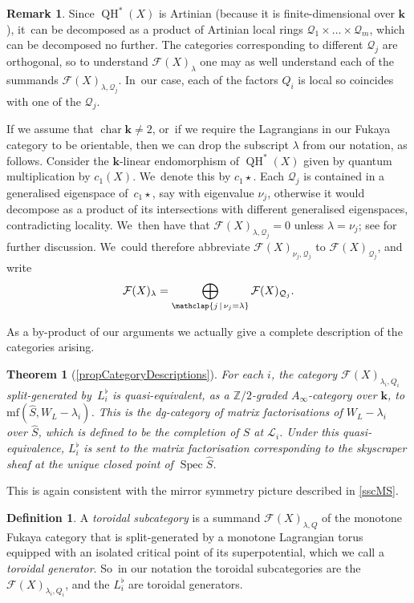 \documentclass[JEP,XML,SOM,Unicode,NoEqCountersInSection,NoFloatCountersInSection,published]{cedram}
\newtheorem{mainthm}{Theorem}
\theoremstyle{definition}
\newtheorem{definition}[theorem]{Definition}
\newtheorem{remark}[theorem]{Remark}
\newcommand{\ZZ}{\mathbb{Z}}
\newcommand{\LL}{L^\flat}
\newcommand{\hatS}{\widehat{S}}
\newcommand{\calL}{\mathcal{L}}
\newcommand{\calQ}{\mathcal{Q}}
\newcommand{\Fuk}{\mathcal{F}}
\newcommand{\kk}{{\boldsymbol{k}}}
\newcommand{\mf}{\mathrm{mf}}
\newcommand{\Char}{\operatorname{char}}
\newcommand{\Spec}{\operatorname{Spec}}
\newcommand{\QH}{\operatorname{QH}}
\newcommand{\qprod}{\mathbin{\star}}
\begin{document}
\begin{remark}
\label{rmkArtinian}
Since $\QH^*(X)$ is Artinian (because it is finite-dimensional over $\kk$), it~can be decomposed as a product of Artinian local rings $\calQ_1 \times \dots \times \calQ_m$, which can be decomposed no further. The categories corresponding to different $\calQ_j$ are orthogonal, so to understand $\Fuk(X)_{\lambda}$ one may as well understand each of the summands $\Fuk(X)_{\lambda, \calQ_j}$. In~our case, each of the factors $Q_i$ is local so coincides with one of the $\calQ_j$.

If we assume that $\Char \kk \neq 2$, or~if we require the Lagrangians in our Fukaya category to be orientable, then we can drop the subscript $\lambda$ from our notation, as follows. Consider the $\kk$-linear endomorphism of $\QH^*(X)$ given by quantum multiplication by $c_1(X)$. We~denote this by $c_1 \qprod$. Each $\calQ_j$ is contained in a generalised eigenspace of~$c_1 \qprod$, say with eigenvalue $\nu_j$, otherwise it would decompose as a product of its intersections with different generalised eigenspaces, contradicting locality. We~then have that $\Fuk(X)_{\lambda, \calQ_j} = 0$ unless $\lambda = \nu_j$; see \cite[App.\,A]{SmithHHviaHF} for further discussion. We~could therefore abbreviate $\Fuk(X)_{\nu_j, \calQ_j}$ to $\Fuk(X)_{\calQ_j}$, and write
\[
\Fuk(X)_\lambda = \bigoplus_{\mathclap{j \,\mid\, \nu_j = \lambda}}\Fuk(X)_{\calQ_j}.
\]
\end{remark}

As a by-product of our arguments we actually give a complete description of the categories arising.

\begin{mainthm}[\cref{propCategoryDescriptions}]
\label{TheoremC}
For each $i$, the category $\Fuk(X)_{\lambda_i, Q_i}$ split-generated by~$\LL_i$ is quasi-equivalent, as a $\ZZ/2$-graded $A_\infty$-category over $\kk$, to $\mf(\hatS, W_L - \lambda_i)$. This is the dg-category of matrix factorisations of $W_L - \lambda_i$ over $\hatS$, which is defined to be the completion of $S$ at $\calL_i$. Under this quasi-equivalence, $\LL_i$ is sent to the matrix factorisation corresponding to the skyscraper sheaf at the unique closed point of $\Spec \hatS$.
\end{mainthm}

This is again consistent with the mirror symmetry picture described in \cref{sscMS}.

\begin{definition}
\label{defToroidal}
A \emph{toroidal subcategory} is a summand $\Fuk(X)_{\lambda, Q}$ of the monotone Fukaya category that is split-generated by a monotone Lagrangian torus equipped with an isolated critical point of its superpotential, which we call a \emph{toroidal generator}. So~in our notation the toroidal subcategories are the $\Fuk(X)_{\lambda_i, Q_i}$, and the $\LL_i$ are toroidal generators.
\end{definition}
\end{document}
